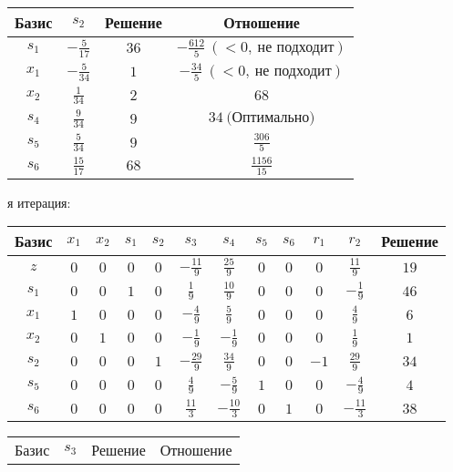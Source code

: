 \documentclass{article}%
\begin{document}
\begin{flushleft}
\newline%
\begin{tabular}{|cccc|}%
\hline%
Базис&$s_{2}$&Решение&Отношение\\%
\hline%
$s_{1}$&$-\frac{5}{17}$&$36$&$-\frac{612}{5}\: (< 0, \: \text{не подходит})$\\%
$x_{1}$&$-\frac{5}{34}$&$1$&$-\frac{34}{5}\: (< 0, \: \text{не подходит})$\\%
$x_{2}$&$\frac{1}{34}$&$2$&$68$\\%
$s_{4}$&$\frac{9}{34}$&$9$&$34\: \text{(Оптимально)}$\\%
$s_{5}$&$\frac{5}{34}$&$9$&$\frac{306}{5}$\\%
$s_{6}$&$\frac{15}{17}$&$68$&$\frac{1156}{15}$\\%
\hline%
\end{tabular}%
\newline%
\newline%
я итерация: %
\newline%
\newline%
\renewcommand{\arraystretch}{1.3}%
\begin{tabular}{|c|cccccccccc|c|}%
\hline%
Базис&$x_{1}$&$x_{2}$&$s_{1}$&$s_{2}$&$s_{3}$&$s_{4}$&$s_{5}$&$s_{6}$&$r_{1}$&$r_{2}$&Решение\\%
\hline%
$z$&$0$&$0$&$0$&$0$&$-\frac{11}{9}$&$\frac{25}{9}$&$0$&$0$&$0$&$\frac{11}{9}$&$19$\\%
\hline%
$s_{1}$&$0$&$0$&$1$&$0$&$\frac{1}{9}$&$\frac{10}{9}$&$0$&$0$&$0$&$-\frac{1}{9}$&$46$\\%
$x_{1}$&$1$&$0$&$0$&$0$&$-\frac{4}{9}$&$\frac{5}{9}$&$0$&$0$&$0$&$\frac{4}{9}$&$6$\\%
$x_{2}$&$0$&$1$&$0$&$0$&$-\frac{1}{9}$&$-\frac{1}{9}$&$0$&$0$&$0$&$\frac{1}{9}$&$1$\\%
$s_{2}$&$0$&$0$&$0$&$1$&$-\frac{29}{9}$&$\frac{34}{9}$&$0$&$0$&$-1$&$\frac{29}{9}$&$34$\\%
$s_{5}$&$0$&$0$&$0$&$0$&$\frac{4}{9}$&$-\frac{5}{9}$&$1$&$0$&$0$&$-\frac{4}{9}$&$4$\\%
$s_{6}$&$0$&$0$&$0$&$0$&$\frac{11}{3}$&$-\frac{10}{3}$&$0$&$1$&$0$&$-\frac{11}{3}$&$38$\\%
\hline%
\end{tabular}%
\newline%
\newline%
\newline%
\begin{tabular}{|cccc|}%
\hline%
Базис&$s_{3}$&Решение&Отношение\\%

\end{tabular}
\end{flushleft}
\end{document}
